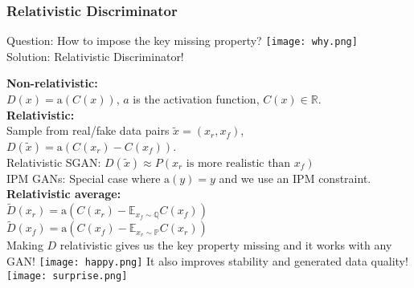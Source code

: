 \documentclass[t]{beamer}
\begin{document}
\begin{frame}
\frametitle{Relativistic Discriminator}
Question: How to impose the key missing property? \texttt{[image: why.png]} \\
Solution: Relativistic Discriminator! \vspace{.25cm}

	\textbf{Non-relativistic:} \\ $D(x)=\text{a}(C(x))$, $a$ is the activation function, $C(x) \in \mathbb{R}$. \\ \vspace{.10cm}
\textbf{Relativistic:} \\ Sample from real/fake data pairs $\tilde{x}=(x_r,x_f)$, $D(\tilde{x}) = \text{a}(C(x_r)-C(x_f))$. \\
Relativistic SGAN: $D(\tilde{x}) \approx P(x_r \text{ is more realistic than } x_f)$ \\
IPM GANs: Special case where $\text{a}(y)=y$ and we use an IPM constraint. \\ \vspace{.10cm}
\textbf{Relativistic average:} \\ 
$\tilde{D}(x_r)=\text{a} \left( C(x_r)-\mathbb{E}_{x_f \sim \mathbb{Q}} C(x_f) \right)$ \\ $\tilde{D}(x_f)=\text{a} \left( C(x_f)-\mathbb{E}_{x_r \sim \mathbb{P}} C(x_r) \right)$ \\ \vspace{.25cm}
Making $D$ relativistic  gives us the key property missing and it works with any GAN! \texttt{[image: happy.png]} It also improves stability and generated data quality! \texttt{[image: surprise.png]}

\end{frame}

\end{document}
